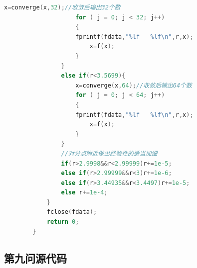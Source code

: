 \documentclass[10pt, a4paper]{article}
\begin{document}
\begin{lstlisting}[language=C]
                    x=converge(x,32);//收敛后输出32个数
                    for ( j = 0; j < 32; j++)
                    {
                    fprintf(fdata,"%lf   %lf\n",r,x);
                        x=f(x);
                    }
                }
                else if(r<3.5699){
                    x=converge(x,64);//收敛后输出64个数
                    for ( j = 0; j < 64; j++)
                    {
                    fprintf(fdata,"%lf   %lf\n",r,x);
                        x=f(x);
                    }
                }
                //对分点附近做出经验性的适当加细
                if(r>2.9998&&r<2.99999)r+=1e-5;
                else if(r>2.99999&&r<3)r+=1e-6;
                else if(r>3.44935&&r<3.4497)r+=1e-5;
                else r+=1e-4;
            }    
            fclose(fdata);
            return 0;
        }
    \end{lstlisting}

    \subsection{第九问源代码}
\end{document}
